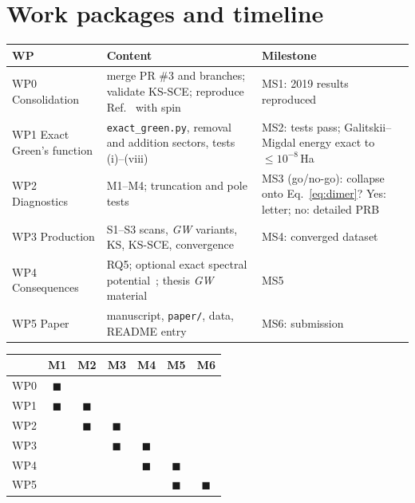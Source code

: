 \documentclass[11pt,a4paper]{article}
\newcommand{\GW}{\textit{GW}}
\newcommand{\code}[1]{\texttt{#1}}
\begin{document}
\section{Work packages and timeline}
\begin{table}[h]
\centering\small
\begin{tabularx}{\textwidth}{@{}lYY@{}}
\toprule
WP & Content & Milestone\\
\midrule
WP0 Consolidation & merge PR \#3 and branches; validate KS-SCE; reproduce Ref.~\cite{wetherell2019} with spin & MS1: 2019 results reproduced\\
WP1 Exact Green's function & \code{exact\_green.py}, removal and addition sectors, tests (i)--(viii) & MS2: tests pass; Galitskii--Migdal energy exact to $\le10^{-8}$\,Ha\\
WP2 Diagnostics & M1--M4; truncation and pole tests & MS3 (go/no-go): collapse onto Eq.~\eqref{eq:dimer}? Yes: letter; no: detailed PRB\\
WP3 Production & S1--S3 scans, \GW{} variants, KS, KS-SCE, convergence & MS4: converged dataset\\
WP4 Consequences & RQ5; optional exact spectral potential~\cite{vanzini2018}; thesis \GW{} material & MS5\\
WP5 Paper & manuscript, \code{paper/}, data, README entry & MS6: submission\\
\bottomrule
\end{tabularx}

\vspace{6pt}
\begin{tabular}{lcccccc}
\toprule
 & M1 & M2 & M3 & M4 & M5 & M6\\
\midrule
WP0 & $\blacksquare$ & & & & & \\
WP1 & $\blacksquare$ & $\blacksquare$ & & & & \\
WP2 & & $\blacksquare$ & $\blacksquare$ & & & \\
WP3 & & & $\blacksquare$ & $\blacksquare$ & & \\
WP4 & & & & $\blacksquare$ & $\blacksquare$ & \\
WP5 & & & & & $\blacksquare$ & $\blacksquare$\\
\bottomrule
\end{tabular}
\end{table}

\end{document}
